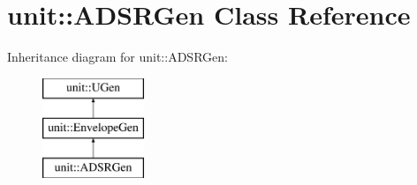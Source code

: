 \hypertarget{classunit_1_1ADSRGen}{\section{unit\-:\-:A\-D\-S\-R\-Gen Class Reference}
\label{classunit_1_1ADSRGen}
}
Inheritance diagram for unit\-:\-:A\-D\-S\-R\-Gen\-:\begin{figure}[H]
\begin{center}
\leavevmode
\includegraphics[height=3.000000cm]{classunit_1_1ADSRGen}
\end{center}
\end{figure}
